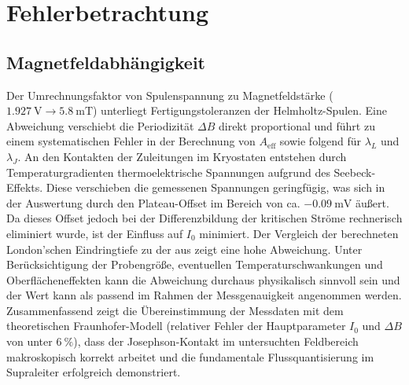 \section{Fehlerbetrachtung}


\subsection{Magnetfeldabhängigkeit}

Der Umrechnungsfaktor von Spulenspannung zu Magnetfeldstärke ($1.927\ \text{V} \rightarrow 5.8\ \text{mT}$) unterliegt Fertigungstoleranzen der Helmholtz-Spulen. Eine Abweichung verschiebt die Periodizität $\Delta B$ direkt proportional und führt zu einem systematischen Fehler in der Berechnung von $A_{\text{eff}}$ sowie folgend für $\lambda_L$ und $\lambda_J$.
An den Kontakten der Zuleitungen im Kryostaten entstehen durch Temperaturgradienten thermoelektrische Spannungen aufgrund des Seebeck-Effekts. Diese verschieben die gemessenen Spannungen geringfügig, was sich in der Auswertung durch den Plateau-Offset im Bereich von ca. $-0.09\ \text{mV}$ äußert. Da dieses Offset jedoch bei der Differenzbildung der kritischen Ströme rechnerisch eliminiert wurde, ist der Einfluss auf $I_0$ minimiert.
Der Vergleich der berechneten London'schen Eindringtiefe zu der aus \cite{kittel} zeigt eine hohe Abweichung. Unter Berücksichtigung der Probengröße, eventuellen Temperaturschwankungen und Oberflächeneffekten kann die Abweichung durchaus physikalisch sinnvoll sein und der Wert kann als passend im Rahmen der Messgenauigkeit angenommen werden.
Zusammenfassend zeigt die Übereinstimmung der Messdaten mit dem theoretischen Fraunhofer-Modell (relativer Fehler der Hauptparameter $I_0$ und $\Delta B$ von unter $6\ \%$), dass der Josephson-Kontakt im untersuchten Feldbereich makroskopisch korrekt arbeitet und die fundamentale Flussquantisierung im Supraleiter erfolgreich demonstriert.